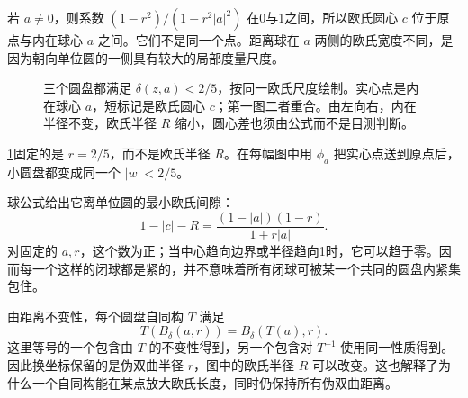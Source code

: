 若 \(a\ne0\)，则系数 \((1-r^2)/(1-r^2|a|^2)\) 在0与1之间，所以欧氏圆心 \(c\) 位于原点与内在球心 \(a\) 之间。它们不是同一个点。距离球在 \(a\) 两侧的欧氏宽度不同，是因为朝向单位圆的一侧具有较大的局部度量尺度。

\begin{figure}[htbp]
\centering
{}
\caption[固定伪双曲半径的球]{三个圆盘都满足 \(\delta(z,a)<2/5\)，按同一欧氏尺度绘制。实心点是内在球心 \(a\)，短标记是欧氏圆心 \(c\)；第一图二者重合。由左向右，内在半径不变，欧氏半径 \(R\) 缩小，圆心差也须由公式而不是目测判断。}
\label{b3:fig:06-pseudohyperbolic-balls}
\end{figure}

\cref{b3:fig:06-pseudohyperbolic-balls}固定的是 \(r=2/5\)，而不是欧氏半径 \(R\)。在每幅图中用 \(\phi_a\) 把实心点送到原点后，小圆盘都变成同一个 \(|w|<2/5\)。

\ProseParagraphBreak

球公式给出它离单位圆的最小欧氏间隙：
\[
 1-|c|-R
 =\frac{(1-|a|)(1-r)}{1+r|a|}.
\]
对固定的 \(a,r\)，这个数为正；当中心趋向边界或半径趋向1时，它可以趋于零。因而每一个这样的闭球都是紧的，并不意味着所有闭球可被某一个共同的圆盘内紧集包住。

\ProseParagraphBreak

由距离不变性，每个圆盘自同构 \(T\) 满足
\[
 T(B_\delta(a,r))=B_\delta(T(a),r).
\]
这里等号的一个包含由 \(T\) 的不变性得到，另一个包含对 \(T^{-1}\) 使用同一性质得到。因此换坐标保留的是伪双曲半径 \(r\)，图中的欧氏半径 \(R\) 可以改变。这也解释了为什么一个自同构能在某点放大欧氏长度，同时仍保持所有伪双曲距离。

